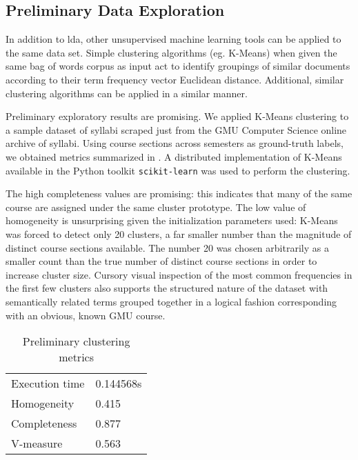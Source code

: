 
\subsection{Preliminary Data Exploration}
\label{sec:data-exploration}


In addition to \ac{lda}, other unsupervised machine learning tools can be applied to the same data set.
Simple clustering algorithms (eg. K-Means) when given the same bag of words corpus as input act to identify groupings of similar documents according to their term frequency vector Euclidean distance. \cite{lloyd1982}
Additional, similar clustering algorithms can be applied in a similar manner.


Preliminary exploratory results are promising.
We applied K-Means clustering to a sample dataset of syllabi scraped just from the GMU Computer Science online archive of syllabi.
Using course sections across semesters as ground-truth labels, we obtained metrics summarized in .
A distributed implementation of K-Means available in the Python toolkit \texttt{scikit-learn} was used to perform the clustering.


The high completeness values are promising: this indicates that many of the same course are assigned under the same cluster prototype.
The low value of homogeneity is unsurprising given the initialization parameters used: K-Means was forced to detect only 20 clusters, a far smaller number than the magnitude of distinct course sections available.
The number 20 was chosen arbitrarily as a smaller count than the true number of distinct course sections in order to increase cluster size.
Cursory visual inspection of the most common frequencies in the first few clusters also supports the structured nature of the dataset with semantically related terms grouped together in a logical fashion corresponding with an obvious, known GMU course.


\begin{table}[ht]
\centering
\begin{tabular}{ll}
\toprule
Execution time & 0.144568s \\
Homogeneity & 0.415 \\
Completeness & 0.877 \\
V-measure & 0.563 \\
\bottomrule
\end{tabular}
\caption{Preliminary clustering metrics\label{table:cluster-metrics}}
\end{table}

